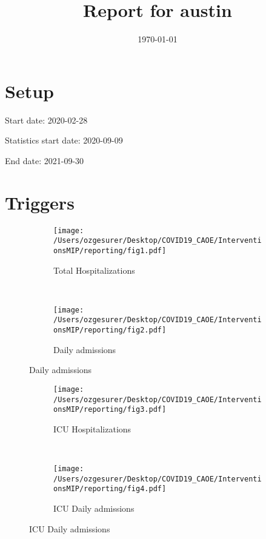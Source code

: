 \documentclass{article}
\title{Report for austin}
\author{}
\date{\today}
\begin{document}
\maketitle

\section*{Setup}

Start date: 2020-02-28

Statistics start date: 2020-09-09

End date: 2021-09-30 




\section*{Triggers}
\begin{figure}[!htb]
  \centering
  \setlength{\unitlength}{1cm}
    \begin{subfigure}[b]{0.475\linewidth}
    \centering
        \texttt{[image: /Users/ozgesurer/Desktop/COVID19\_CAOE/InterventionsMIP/reporting/fig1.pdf]}
        \caption{Total Hospitalizations}
        \label{fig:IHT}
    \end{subfigure}
    ~
    \begin{subfigure}[b]{0.475\linewidth}
    \centering
         \texttt{[image: /Users/ozgesurer/Desktop/COVID19\_CAOE/InterventionsMIP/reporting/fig2.pdf]}
        \caption{Daily admissions}
        \label{fig:ToIHT}
    \end{subfigure}
\end{figure}
\vspace{1cm}
\begin{figure}[!htb]
	\centering
	\setlength{\unitlength}{1cm}
	\begin{subfigure}[b]{0.475\linewidth}
		\centering
		\texttt{[image: /Users/ozgesurer/Desktop/COVID19\_CAOE/InterventionsMIP/reporting/fig3.pdf]}
		\caption{ICU Hospitalizations}
		\label{fig:ICU}
	\end{subfigure}
	~
	\begin{subfigure}[b]{0.475\linewidth}
		\centering
		\texttt{[image: /Users/ozgesurer/Desktop/COVID19\_CAOE/InterventionsMIP/reporting/fig4.pdf]}
		\caption{ICU Daily admissions}
		\label{fig:ToICU}
	\end{subfigure}
\end{figure}
\end{document}
